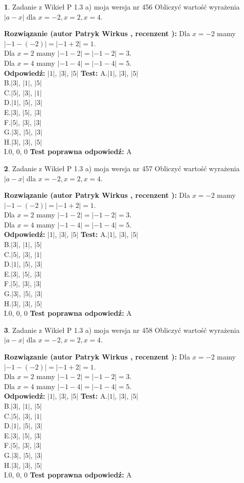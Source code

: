 \documentclass[12pt, a4paper]{article}
\theoremstyle{definition} %
\newtheorem{zad}{}
\newcommand{\zadStart}[1]{\begin{zad}#1\newline}
\newcommand{\zadStop}{\end{zad}}
\newcommand{\rozwStart}[2]{\noindent \textbf{Rozwiązanie (autor #1 , recenzent #2): }\newline}
\newcommand{\rozwStop}{\newline}
\newcommand{\odpStart}{\noindent \textbf{Odpowiedź:}\newline}
\newcommand{\odpStop}{\newline}
\newcommand{\testStart}{\noindent \textbf{Test:}\newline}
\newcommand{\testStop}{\newline}
\newcommand{\kluczStart}{\noindent \textbf{Test poprawna odpowiedź:}\newline}
\newcommand{\kluczStop}{\newline}
\begin{document}
\zadStart{Zadanie z Wikieł P 1.3 a) moja wersja nr 456}
Obliczyć wartość wyrażenia $|a - x|$ dla $x=-2,x=2,x=4$.
\zadStop
\rozwStart{Patryk Wirkus}{}
Dla $x = -2$ mamy $|-1 - (-2)| = |-1 + 2| = 1$.\\
Dla $x = 2$ mamy $|-1 - 2| = |-1 - 2| = 3$.\\
Dla $x = 4$ mamy $|-1 - 4| = |-1 - 4| = 5$.\\
\rozwStop
\odpStart
$|1|$, $|3|$, $|5|$
\odpStop
\testStart
A.$|1|$, $|3|$, $|5|$\\
B.$|3|$, $|1|$, $|5|$\\
C.$|5|$, $|3|$, $|1|$\\
D.$|1|$, $|5|$, $|3|$\\
E.$|3|$, $|5|$, $|3|$\\
F.$|5|$, $|3|$, $|3|$\\
G.$|3|$, $|5|$, $|3|$\\
H.$|3|$, $|3|$, $|5|$\\
I.$0$, $0$, $0$
\testStop
\kluczStart
A
\kluczStop



\zadStart{Zadanie z Wikieł P 1.3 a) moja wersja nr 457}
Obliczyć wartość wyrażenia $|a - x|$ dla $x=-2,x=2,x=4$.
\zadStop
\rozwStart{Patryk Wirkus}{}
Dla $x = -2$ mamy $|-1 - (-2)| = |-1 + 2| = 1$.\\
Dla $x = 2$ mamy $|-1 - 2| = |-1 - 2| = 3$.\\
Dla $x = 4$ mamy $|-1 - 4| = |-1 - 4| = 5$.\\
\rozwStop
\odpStart
$|1|$, $|3|$, $|5|$
\odpStop
\testStart
A.$|1|$, $|3|$, $|5|$\\
B.$|3|$, $|1|$, $|5|$\\
C.$|5|$, $|3|$, $|1|$\\
D.$|1|$, $|5|$, $|3|$\\
E.$|3|$, $|5|$, $|3|$\\
F.$|5|$, $|3|$, $|3|$\\
G.$|3|$, $|5|$, $|3|$\\
H.$|3|$, $|3|$, $|5|$\\
I.$0$, $0$, $0$
\testStop
\kluczStart
A
\kluczStop



\zadStart{Zadanie z Wikieł P 1.3 a) moja wersja nr 458}
Obliczyć wartość wyrażenia $|a - x|$ dla $x=-2,x=2,x=4$.
\zadStop
\rozwStart{Patryk Wirkus}{}
Dla $x = -2$ mamy $|-1 - (-2)| = |-1 + 2| = 1$.\\
Dla $x = 2$ mamy $|-1 - 2| = |-1 - 2| = 3$.\\
Dla $x = 4$ mamy $|-1 - 4| = |-1 - 4| = 5$.\\
\rozwStop
\odpStart
$|1|$, $|3|$, $|5|$
\odpStop
\testStart
A.$|1|$, $|3|$, $|5|$\\
B.$|3|$, $|1|$, $|5|$\\
C.$|5|$, $|3|$, $|1|$\\
D.$|1|$, $|5|$, $|3|$\\
E.$|3|$, $|5|$, $|3|$\\
F.$|5|$, $|3|$, $|3|$\\
G.$|3|$, $|5|$, $|3|$\\
H.$|3|$, $|3|$, $|5|$\\
I.$0$, $0$, $0$
\testStop
\kluczStart
A
\kluczStop
\end{document}
